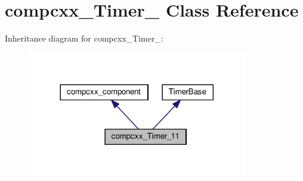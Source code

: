 \hypertarget{classcompcxx__Timer__11}{}\section{compcxx\+\_\+\+Timer\+\_ Class Reference}
\label{classcompcxx__Timer__11}


Inheritance diagram for compcxx\+\_\+\+Timer\+\_\+:\nopagebreak
\begin{figure}[H]
\begin{center}
\leavevmode
\includegraphics[width=272pt]{classcompcxx__Timer__11__inherit__graph}
\end{center}
\end{figure}


